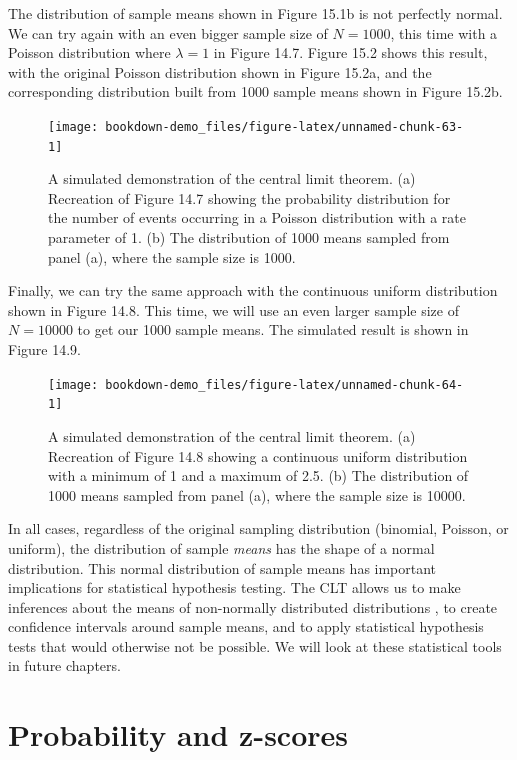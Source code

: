\documentclass[
]{scrbook}
\begin{document}
The distribution of sample means shown in Figure 15.1b is not perfectly normal.
We can try again with an even bigger sample size of \(N = 1000\), this time with a Poisson distribution where \(\lambda = 1\) in Figure 14.7.
Figure 15.2 shows this result, with the original Poisson distribution shown in Figure 15.2a, and the corresponding distribution built from 1000 sample means shown in Figure 15.2b.

\begin{figure}
\texttt{[image: bookdown-demo\_files/figure-latex/unnamed-chunk-63-1]} \caption{A simulated demonstration of the central limit theorem. (a) Recreation of Figure 14.7 showing the probability distribution for the number of events occurring in a Poisson distribution with a rate parameter of 1. (b) The distribution of 1000 means sampled from panel (a), where the sample size is 1000.}\label{fig:unnamed-chunk-63}
\end{figure}

Finally, we can try the same approach with the continuous uniform distribution shown in Figure 14.8.
This time, we will use an even larger sample size of \(N = 10000\) to get our 1000 sample means.
The simulated result is shown in Figure 14.9.

\begin{figure}
\texttt{[image: bookdown-demo\_files/figure-latex/unnamed-chunk-64-1]} \caption{A simulated demonstration of the central limit theorem. (a) Recreation of Figure 14.8 showing a continuous uniform distribution with a minimum of 1 and a maximum of 2.5. (b) The distribution of 1000 means sampled from panel (a), where the sample size is 10000.}\label{fig:unnamed-chunk-64}
\end{figure}

In all cases, regardless of the original sampling distribution (binomial, Poisson, or uniform), the distribution of sample \emph{means} has the shape of a normal distribution.
This normal distribution of sample means has important implications for statistical hypothesis testing.
The CLT allows us to make inferences about the means of non-normally distributed distributions \citep{Sokal1995}, to create confidence intervals around sample means, and to apply statistical hypothesis tests that would otherwise not be possible.
We will look at these statistical tools in future chapters.

\hypertarget{probability-and-z-scores}{%
\section{Probability and z-scores}\label{probability-and-z-scores}}
\end{document}

